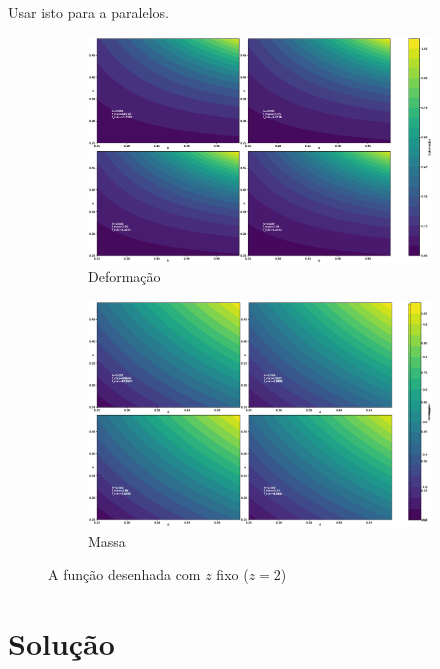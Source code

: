 \documentclass[a4paper,12pt]{article}
\begin{document}
Usar isto para a paralelos.

\begin{figure}[!htbp]
\centering
\begin{subfigure}{.5\textwidth}
  \centering
  \includegraphics[width=.99\linewidth]{deformacao.eps}
  \caption{Deformação}
  \label{fig:sub1}
\end{subfigure}%
\begin{subfigure}{.5\textwidth}
  \centering
  \includegraphics[width=.99\linewidth]{massa.eps}
  \caption{Massa}
  \label{fig:sub2}
\end{subfigure}
\caption{\label{fig:defIm2}A função desenhada com $z$ fixo ($z=2$)}
\end{figure}

\section{Solução}
\end{document}
